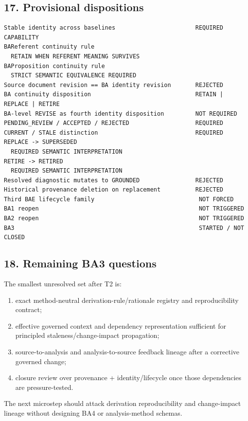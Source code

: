 \documentclass[11pt,a4paper]{article}
\providecommand{\tightlist}{\setlength{\itemsep}{0pt}\setlength{\parskip}{0pt}}\setlength{\emergencystretch}{4em}\hbadness=10000\hfuzz=20pt\sloppy
\begin{document}
\subsection{17. Provisional
dispositions}\label{provisional-dispositions}

\begin{verbatim}
Stable identity across baselines                       REQUIRED CAPABILITY
BAReferent continuity rule
  RETAIN WHEN REFERENT MEANING SURVIVES
BAProposition continuity rule
  STRICT SEMANTIC EQUIVALENCE REQUIRED
Source document revision == BA identity revision       REJECTED
BA continuity disposition                              RETAIN | REPLACE | RETIRE
BA-level REVISE as fourth identity disposition         NOT REQUIRED
PENDING_REVIEW / ACCEPTED / REJECTED                   REQUIRED
CURRENT / STALE distinction                            REQUIRED
REPLACE -> SUPERSEDED
  REQUIRED SEMANTIC INTERPRETATION
RETIRE -> RETIRED
  REQUIRED SEMANTIC INTERPRETATION
Resolved diagnostic mutates to GROUNDED                REJECTED
Historical provenance deletion on replacement          REJECTED
Third BAE lifecycle family                              NOT FORCED
BA1 reopen                                              NOT TRIGGERED
BA2 reopen                                              NOT TRIGGERED
BA3                                                     STARTED / NOT CLOSED
\end{verbatim}

\subsection{18. Remaining BA3 questions}\label{remaining-ba3-questions}

The smallest unresolved set after T2 is:

\begin{enumerate}
\def\labelenumi{\arabic{enumi}.}
\tightlist
\item
  exact method-neutral derivation-rule/rationale registry and
  reproducibility contract;
\item
  effective governed context and dependency representation sufficient
  for principled staleness/change-impact propagation;
\item
  source-to-analysis and analysis-to-source feedback lineage after a
  corrective governed change;
\item
  closure review over provenance + identity/lifecycle once those
  dependencies are pressure-tested.
\end{enumerate}

The next microstep should attack derivation reproducibility and
change-impact lineage without designing BA4 or analysis-method schemas.
\end{document}
